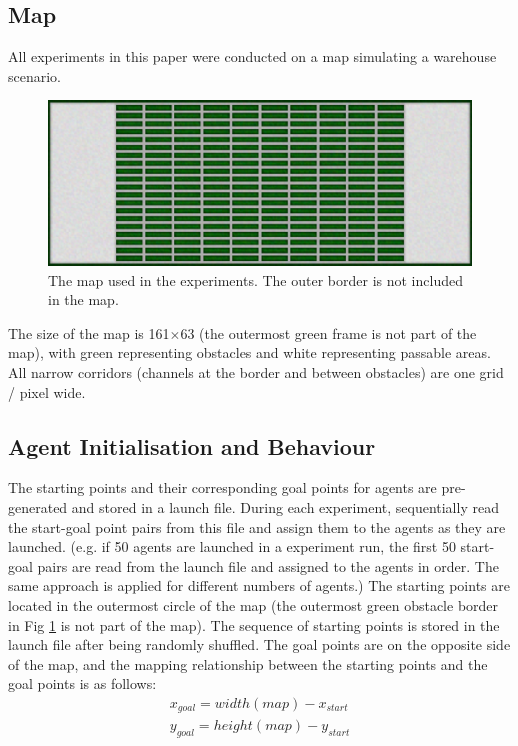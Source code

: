 \subsection*{Map}

All experiments in this paper were conducted on a map simulating a warehouse scenario.

\begin{figure}[htbp]
    \centering
    \includegraphics*[width = \linewidth]{figures/map(color).png}
    \caption{The map used in the experiments. The outer border is not included in the map.}
    \label{fig:Map}
\end{figure}

The size of the map is 161$\times$63 (the outermost green frame is not part of the map), 
with green representing obstacles and white representing passable areas.
All narrow corridors (channels at the border and between obstacles) are one grid / pixel wide.

\subsection*{Agent Initialisation and Behaviour}
The starting points and their corresponding goal points for agents are pre-generated and stored in a launch file. 
During each experiment, sequentially read the start-goal point pairs from this file and assign them to the agents as they are launched.
(e.g. if 50 agents are launched in a experiment run, the first 50 start-goal pairs are read from the launch file and assigned to the agents in order. The same approach is applied for different numbers of agents.)
The starting points are located in the outermost circle of the map (the outermost green obstacle border in Fig \ref{fig:Map} is not part of the map). The sequence of starting points is stored in the launch file after being randomly shuffled.
The goal points are on the opposite side of the map, and the mapping relationship between the starting points and the goal points is as follows:
\begin{align}
    x_{goal} = width(map) - x_{start}  \\
    y_{goal} = height(map) - y_{start} 
\end{align}

